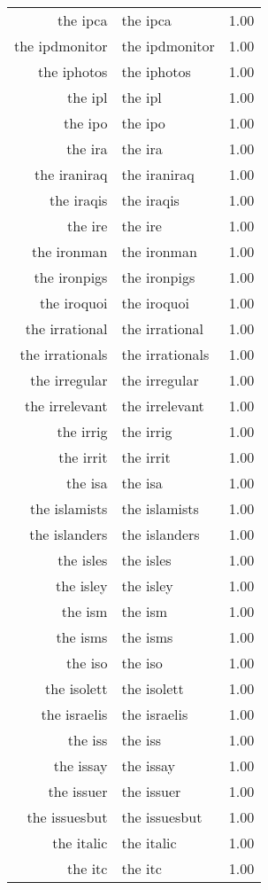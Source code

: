 \begin{table}[ht]
\begin{tabular}{rlr}
  the ipca & the ipca & 1.00 \\ 
  the ipdmonitor & the ipdmonitor & 1.00 \\ 
  the iphotos & the iphotos & 1.00 \\ 
  the ipl & the ipl & 1.00 \\ 
  the ipo & the ipo & 1.00 \\ 
  the ira & the ira & 1.00 \\ 
  the iraniraq & the iraniraq & 1.00 \\ 
  the iraqis & the iraqis & 1.00 \\ 
  the ire & the ire & 1.00 \\ 
  the ironman & the ironman & 1.00 \\ 
  the ironpigs & the ironpigs & 1.00 \\ 
  the iroquoi & the iroquoi & 1.00 \\ 
  the irrational & the irrational & 1.00 \\ 
  the irrationals & the irrationals & 1.00 \\ 
  the irregular & the irregular & 1.00 \\ 
  the irrelevant & the irrelevant & 1.00 \\ 
  the irrig & the irrig & 1.00 \\ 
  the irrit & the irrit & 1.00 \\ 
  the isa & the isa & 1.00 \\ 
  the islamists & the islamists & 1.00 \\ 
  the islanders & the islanders & 1.00 \\ 
  the isles & the isles & 1.00 \\ 
  the isley & the isley & 1.00 \\ 
  the ism & the ism & 1.00 \\ 
  the isms & the isms & 1.00 \\ 
  the iso & the iso & 1.00 \\ 
  the isolett & the isolett & 1.00 \\ 
  the israelis & the israelis & 1.00 \\ 
  the iss & the iss & 1.00 \\ 
  the issay & the issay & 1.00 \\ 
  the issuer & the issuer & 1.00 \\ 
  the issuesbut & the issuesbut & 1.00 \\ 
  the italic & the italic & 1.00 \\ 
  the itc & the itc & 1.00 \\ 

\end{tabular}
\end{table}

